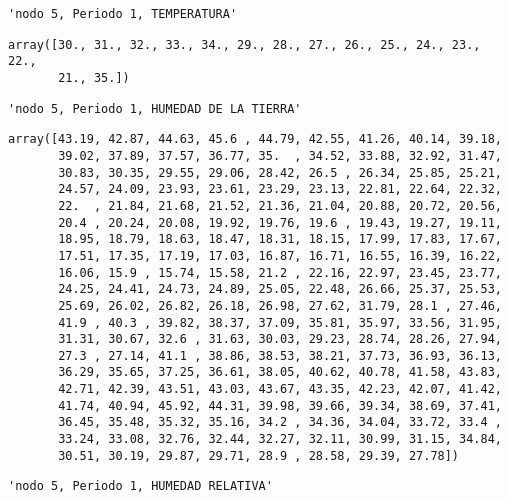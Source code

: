 \documentclass[11pt]{article}
\begin{document}
    
    
    \begin{verbatim}
'nodo 5, Periodo 1, TEMPERATURA'
    \end{verbatim}

    
    
    \begin{verbatim}
array([30., 31., 32., 33., 34., 29., 28., 27., 26., 25., 24., 23., 22.,
       21., 35.])
    \end{verbatim}

    
    
    \begin{verbatim}
'nodo 5, Periodo 1, HUMEDAD DE LA TIERRA'
    \end{verbatim}

    
    
    \begin{verbatim}
array([43.19, 42.87, 44.63, 45.6 , 44.79, 42.55, 41.26, 40.14, 39.18,
       39.02, 37.89, 37.57, 36.77, 35.  , 34.52, 33.88, 32.92, 31.47,
       30.83, 30.35, 29.55, 29.06, 28.42, 26.5 , 26.34, 25.85, 25.21,
       24.57, 24.09, 23.93, 23.61, 23.29, 23.13, 22.81, 22.64, 22.32,
       22.  , 21.84, 21.68, 21.52, 21.36, 21.04, 20.88, 20.72, 20.56,
       20.4 , 20.24, 20.08, 19.92, 19.76, 19.6 , 19.43, 19.27, 19.11,
       18.95, 18.79, 18.63, 18.47, 18.31, 18.15, 17.99, 17.83, 17.67,
       17.51, 17.35, 17.19, 17.03, 16.87, 16.71, 16.55, 16.39, 16.22,
       16.06, 15.9 , 15.74, 15.58, 21.2 , 22.16, 22.97, 23.45, 23.77,
       24.25, 24.41, 24.73, 24.89, 25.05, 22.48, 26.66, 25.37, 25.53,
       25.69, 26.02, 26.82, 26.18, 26.98, 27.62, 31.79, 28.1 , 27.46,
       41.9 , 40.3 , 39.82, 38.37, 37.09, 35.81, 35.97, 33.56, 31.95,
       31.31, 30.67, 32.6 , 31.63, 30.03, 29.23, 28.74, 28.26, 27.94,
       27.3 , 27.14, 41.1 , 38.86, 38.53, 38.21, 37.73, 36.93, 36.13,
       36.29, 35.65, 37.25, 36.61, 38.05, 40.62, 40.78, 41.58, 43.83,
       42.71, 42.39, 43.51, 43.03, 43.67, 43.35, 42.23, 42.07, 41.42,
       41.74, 40.94, 45.92, 44.31, 39.98, 39.66, 39.34, 38.69, 37.41,
       36.45, 35.48, 35.32, 35.16, 34.2 , 34.36, 34.04, 33.72, 33.4 ,
       33.24, 33.08, 32.76, 32.44, 32.27, 32.11, 30.99, 31.15, 34.84,
       30.51, 30.19, 29.87, 29.71, 28.9 , 28.58, 29.39, 27.78])
    \end{verbatim}

    
    
    \begin{verbatim}
'nodo 5, Periodo 1, HUMEDAD RELATIVA'
    \end{verbatim}
\end{document}
